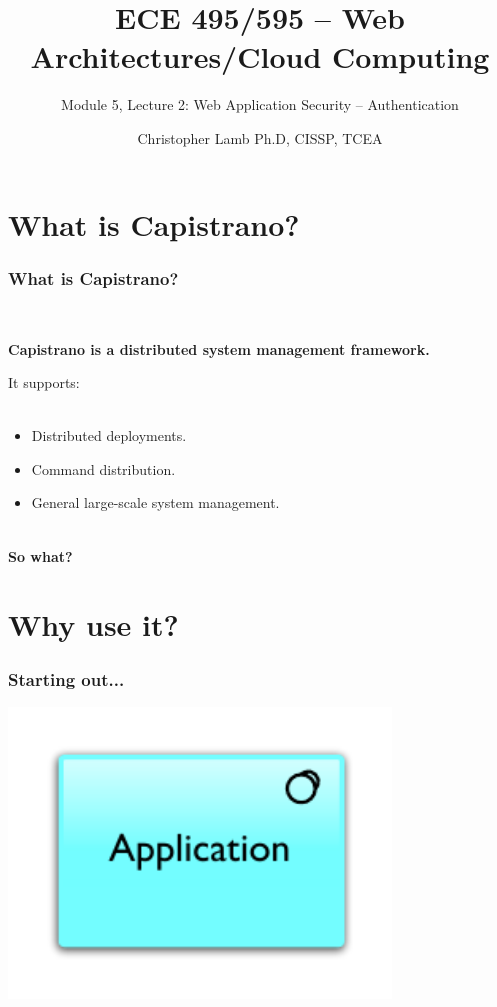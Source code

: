 \documentclass[t,handout]{beamer}
\title[Module 5, Lecture 2]{ECE 495/595 -- Web Architectures/Cloud Computing}
\subtitle{Module 5, Lecture 2: Web Application Security -- Authentication}
\author[\copyright \ 2012 C. C. Lamb]{Christopher Lamb Ph.D, CISSP, TCEA}
\date{}
\institute[University of New Mexico]{\large University of New Mexico}
\begin{document}
\begin{frame}
\titlepage
\end{frame}



\section{What is Capistrano?}
\begin{frame}
\frametitle{What is Capistrano?}
~\\
\begin{center}
{\bf Capistrano is a distributed system management framework.} \\
\end{center}
It supports: \\
~\\
\begin{small}
\begin{itemize}
\item Distributed deployments.
\item Command distribution.
\item General large-scale system management.
\end{itemize}
\end{small}
\begin{center}
~\\
{\bf So what?}
\end{center}
\end{frame}

\section{Why use it?}
\begin{frame}
\frametitle{Starting out...}
\includegraphics[width = 4in]{cap-app.pdf}
\transfade
\end{frame}
\end{document}
